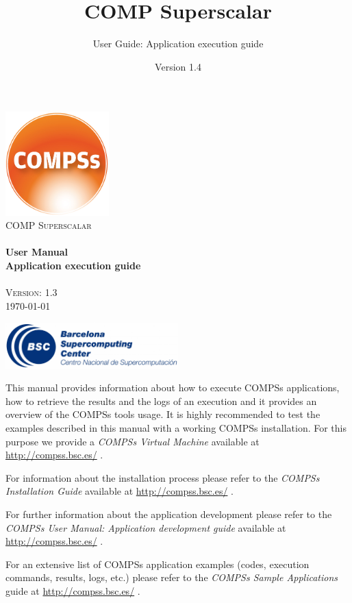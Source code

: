 \documentclass[a4paper,12pt]{article}
\title{COMP Superscalar}
\author{User Guide: Application execution guide}
\date{Version 1.4}
\begin{document}
  \hypersetup{pageanchor=false}
  \begin{titlepage} 
    \begin{center} 
      \includegraphics[width=0.3\textwidth]{./Figures/Logos/degradado-naranja-compss.jpg}~\\[1cm] 
      \textsc{\LARGE COMP Superscalar}\\[1.5cm] 
      
      \HRule \\[0.4cm] 
      { \huge \bfseries User Manual \\[0.4cm] }
      { \large \bfseries Application execution guide \\[0.4cm] } 
      \HRule \\[1.5cm] 

      { \large \textsc{Version: 1.3 }} \\[0.3cm]
      { \large \today } 
      
      \vfill 
      \includegraphics[width=0.5\textwidth]{./Figures/bsc_280.jpg}~\\[1cm]
    \end{center} 
  \end{titlepage}
  \hypersetup{pageanchor=true}
  
  {
    This manual provides information about how to execute COMPSs applications, how to retrieve the results and the logs of an execution and it provides an overview of the COMPSs tools usage. It is highly recommended to test the examples described in this manual with a working COMPSs installation. For this purpose we provide a \textit{COMPSs Virtual Machine} available at \url{http://compss.bsc.es/} .
    \newline
    
    For information about the installation process please refer to the \textit{COMPSs Installation Guide} available at
    \url{http://compss.bsc.es/} .
    \newline
    
    For further information about the application development please refer to the \textit{COMPSs User Manual: Application development
    guide} available at \url{http://compss.bsc.es/} .
    \newline
    
    For an extensive list of COMPSs application examples (codes, execution commands, results, logs, etc.) please refer to the \textit{COMPSs Sample 
    Applications} guide at \url{http://compss.bsc.es/} .
  }
  
\end{document}
